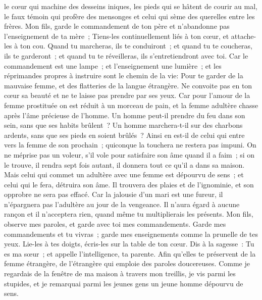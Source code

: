 \begin{multicols}{2}
le cœur qui machine des desseins iniques, les pieds qui se hâtent de courir au mal,
le faux témoin qui profère des mensonges et celui qui sème des querelles entre les frères.
Mon fils, garde le commandement de ton père et n'abandonne pas l'enseignement de ta mère~;
Tiens-les continuellement liés à ton cœur, et attache-les à ton cou.
Quand tu marcheras, ils te conduiront~; et quand tu te coucheras, ils te garderont~; et quand tu te réveilleras, ils s'entretiendront avec toi.
Car le commandement est une lampe~; et l'enseignement une lumière~; et les réprimandes propres à instruire sont le chemin de la vie:
Pour te garder de la mauvaise femme, et des flatteries de la langue étrangère.
Ne convoite pas en ton cœur sa beauté et ne te laisse pas prendre par ses yeux.
Car pour l'amour de la femme prostituée on est réduit à un morceau de pain, et la femme adultère chasse après l'âme précieuse de l'homme.
Un homme peut-il prendre du feu dans son sein, sans que ses habits brûlent~?
Un homme marchera-t-il sur des charbons ardents, sans que ses pieds en soient brûlés~?
Ainsi en est-il de celui qui entre vers la femme de son prochain~; quiconque la touchera ne restera pas impuni.
On ne méprise pas un voleur, s'il vole pour satisfaire son âme quand il a faim~;
si on le trouve, il rendra sept fois autant, il donnera tout ce qu'il a dans sa maison.
Mais celui qui commet un adultère avec une femme est dépourvu de sens~; et celui qui le fera, détruira son âme.
Il trouvera des plaies et de l'ignominie, et son opprobre ne sera pas effacé.
Car la jalousie d'un mari est une fureur, il n'épargnera pas l'adultère au jour de la vengeance.
Il n'aura égard à aucune rançon et il n'acceptera rien, quand même tu multiplierais les présents.
\VerseOne{}Mon fils, observe mes paroles, et garde avec toi mes commandements.
Garde mes commandements et tu vivras~; garde mes enseignements comme la prunelle de tes yeux.
Lie-les à tes doigts, écris-les sur la table de ton cœur.
Dis à la sagesse~: Tu es ma sœur~; et appelle l'intelligence, ta parente.
Afin qu'elles te préservent de la femme étrangère, de l'étrangère qui emploie des paroles doucereuses.
Comme je regardais de la fenêtre de ma maison à travers mon treillis,
je vis parmi les stupides, et je remarquai parmi les jeunes gens un jeune homme dépourvu de sens.

\end{multicols}

